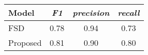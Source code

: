 \begin{tabular}{|l|ccc|}
\hline
\textbf{Model} & \textit{F1} & \textit{precision} & \textit{recall} \\
\hline
           FSD &        0.78 &               0.94 &            0.73 \\
      Proposed &        0.81 &               0.90 &            0.80 \\
\hline
\end{tabular}

